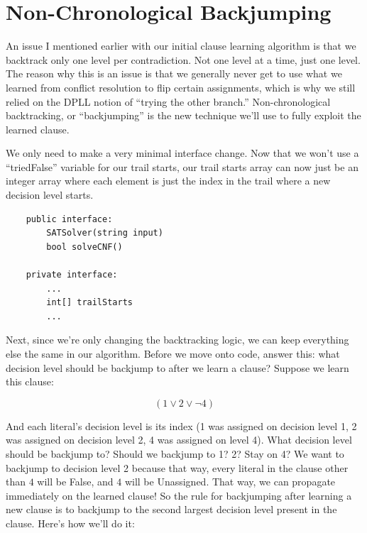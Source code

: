 \section{Non-Chronological Backjumping}

An issue I mentioned earlier with our initial clause learning algorithm is that we backtrack 
only one level per contradiction. Not one level at a time, just one level. The reason why this 
is an issue is that we generally never get to use what we learned from conflict resolution to 
flip certain assignments, which is why we still relied on the DPLL notion of ``trying the other 
branch.'' Non-chronological backtracking, or ``backjumping'' is the new technique we'll use 
to fully exploit the learned clause. 

We only need to make a very minimal interface change. Now that we won't use a ``triedFalse''
variable for our trail starts, our trail starts array can now just be an integer array 
where each element is just the index in the trail where a new decision level starts.
\begin{lstlisting}
    public interface:
        SATSolver(string input)
        bool solveCNF()

    private interface:
        ...
        int[] trailStarts
        ...
\end{lstlisting}

Next, since we're only changing the backtracking logic, we can keep 
everything else the same in our algorithm. Before we move onto code, answer this:
what decision level should be backjump to after we learn a clause? Suppose we learn 
this clause: 

$$ (1 \vee 2 \vee \neg 4) $$

And each literal's decision level is its index (1 was assigned on decision level 1, 
2 was assigned on decision level 2, 4 was assigned on level 4). What decision level 
should be backjump to? Should we backjump to 1? 2? Stay on 4? We want to backjump to 
decision level 2 because that way, every literal in the clause other than $4$ will 
be False, and $4$ will be Unassigned. That way, we can propagate immediately on the 
learned clause! So the rule for backjumping after learning a new clause is to backjump 
to the second largest decision level present in the clause. Here's how we'll do it:


